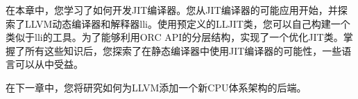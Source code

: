 在本章中，您学习了如何开发JIT编译器。您从JIT编译器的可能应用开始，并探索了LLVM动态编译器和解释器lli。使用预定义的LLJIT类，您可以自己构建一个类似于lli的工具。为了能够利用ORC API的分层结构，实现了一个优化JIT类。掌握了所有这些知识后，您探索了在静态编译器中使用JIT编译器的可能性，一些语言可以从中受益。\par

在下一章中，您将研究如何为LLVM添加一个新CPU体系架构的后端。\par

\newpage